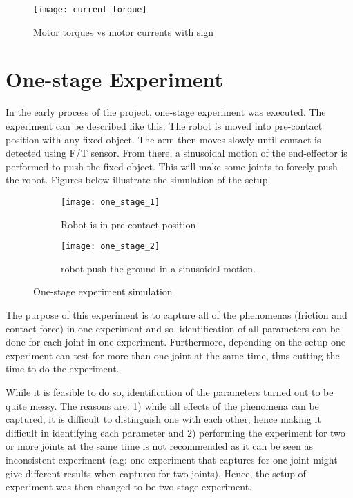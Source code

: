 \begin{figure}[H]
    \centering
    \texttt{[image: current\_torque]}
    \caption{Motor torques vs motor currents with sign}
    \label{fig:current vs torque}
\end{figure}

\section{One-stage Experiment}
In the early process of the project, one-stage experiment was executed. The experiment can be described like this: The robot is moved into pre-contact position with any fixed object. The arm then moves slowly until contact is detected using F/T sensor. From there, a sinusoidal motion of the end-effector is performed to push the fixed object. This will make some joints to forcely push the robot. Figures below illustrate the simulation of the setup.

\begin{figure}[H]
  \begin{subfigure}[t]{0.5\textwidth}
    \centering
    \texttt{[image: one\_stage\_1]} 
    \caption{Robot is in pre-contact position}
  \end{subfigure}
  \begin{subfigure}[t]{0.5\textwidth}
    \centering
    \texttt{[image: one\_stage\_2]}
    \caption{robot push the ground in a sinusoidal motion.}
  \end{subfigure}
  \caption{One-stage experiment simulation}
\end{figure}

The purpose of this experiment is to capture all of the phenomenas (friction and contact force) in one experiment and so, identification of all parameters can be done for each joint in one experiment. Furthermore, depending on the setup one experiment can test for more than one joint at the same time, thus cutting the time to do the experiment. 

While it is feasible to do so, identification of the parameters turned out to be quite messy. The reasons are: 1) while all effects of the phenomena can be captured, it is difficult to distinguish one with each other, hence making it difficult in identifying each parameter and 2) performing the experiment for two or more joints at the same time is not recommended as it can be seen as inconsistent experiment (e.g: one experiment that captures for one joint might give different results when captures for two joints). Hence, the setup of experiment was then changed to be two-stage experiment.

